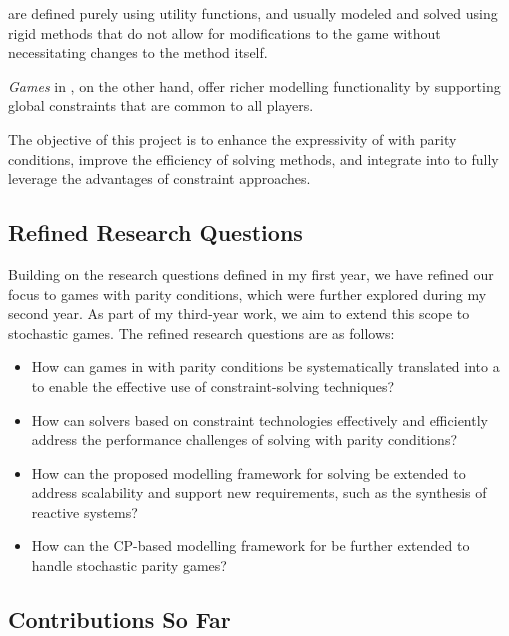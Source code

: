 \documentclass{article}
\begin{document}
\wregulargames are defined purely using utility functions, and usually modeled and solved using rigid methods that do not allow for modifications to the game without necessitating changes to the method itself. 

\textit{Games} in \constraintform, on the other hand, offer richer modelling functionality by supporting global constraints that are common to all players.

The objective of this project is to enhance the expressivity of \wregulargames with parity conditions, improve the efficiency of solving methods, and integrate \wregulargames into \constraintgames to fully leverage the advantages of constraint approaches.

\subsection{Refined Research Questions}

Building on the research questions defined in my first year, we have refined our focus to games with parity conditions, which were further explored during my second year. As part of my third-year work, we aim to extend this scope to stochastic games. The refined research questions are as follows:

\begin{itemize}[left=1.2cm]\label{sec:rq}
    \item[\textbf{RQ1}] How can games in \wregularform with parity conditions be systematically translated into a \constraintform to enable the effective use of constraint-solving techniques?

    \item[\textbf{RQ2}] How can solvers based on constraint technologies effectively and efficiently address the performance challenges of solving \wregulargames with parity conditions?

    \item[\textbf{RQ3}] How can the proposed modelling framework for solving \wregulargames be extended to address scalability and support new requirements, such as the synthesis of reactive systems?

    \item[\textbf{RQ4}] How can the CP-based modelling framework for \wregulargames be further extended to handle stochastic parity games?
\end{itemize}


\subsection{Contributions So Far}
\end{document}
